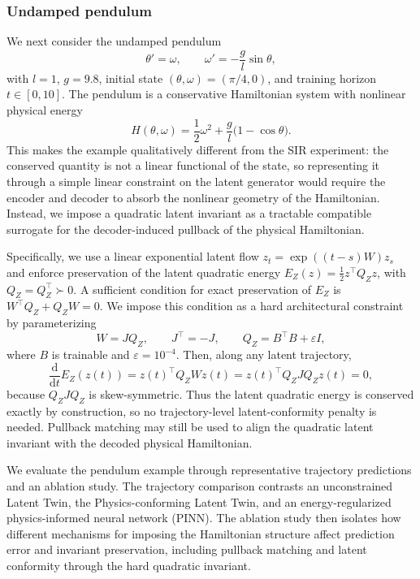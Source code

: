 \documentclass[a4paper,fleqn]{cas-sc}
\theoremstyle{thmstyleone}%
\theoremstyle{thmstyletwo}%
\theoremstyle{thmstylethree}%
\begin{document}
\subsubsection{Undamped pendulum}\label{sec:pendulum}

We next consider the undamped pendulum
\[
    \theta'=\omega,\qquad
    \omega'=-\frac{g}{l}\sin\theta,
\]
with $l=1$, $g=9.8$, initial state $(\theta,\omega)=(\pi/4,0)$, and training horizon $t\in[0,10]$. The pendulum is a conservative Hamiltonian system with nonlinear physical energy
\[
    H(\theta,\omega)
    =
    \frac12 \omega^2+\frac{g}{l}\bigl(1-\cos\theta\bigr).
\]
This makes the example qualitatively different from the SIR experiment: the conserved quantity is not a linear functional of the state, so representing it through a simple linear constraint on the latent generator would require the encoder and decoder to absorb the nonlinear geometry of the Hamiltonian. Instead, we impose a quadratic latent invariant as a tractable compatible surrogate for the decoder-induced pullback of the physical Hamiltonian.

Specifically, we use a linear exponential latent flow $z_t=\exp((t-s)W)z_s$
and enforce preservation of the latent quadratic energy
$ E_Z(z)=\frac12 z^\top Q_Z z$, with $Q_Z=Q_Z^\top\succ0$. A sufficient condition for exact preservation of $E_Z$ is $W^\top Q_Z+Q_ZW=0$.
We impose this condition as a hard architectural constraint by parameterizing
\[
    W=JQ_Z,\qquad
    J^\top=-J,\qquad
    Q_Z=B^\top B+\varepsilon I, 
\]
where $B$ is trainable and $\varepsilon=10^{-4}$. Then, along any latent trajectory,
\[
    \frac{\mathrm d}{\mathrm dt}E_Z(z(t)) =  z(t)^\top Q_Z W z(t) = z(t)^\top Q_Z J Q_Z z(t) = 0,
\]
because $Q_ZJQ_Z$ is skew-symmetric. Thus the latent quadratic energy is conserved exactly by construction, so no trajectory-level latent-conformity penalty is needed. Pullback matching may still be used to align the quadratic latent invariant with the decoded physical Hamiltonian.

We evaluate the pendulum example through representative trajectory predictions and an ablation study. The trajectory comparison contrasts an unconstrained Latent Twin, the Physics-conforming Latent Twin, and an energy-regularized physics-informed neural network (PINN). The ablation study then isolates how different mechanisms for imposing the Hamiltonian structure affect prediction error and invariant preservation, including pullback matching and latent conformity through the hard quadratic invariant.
\end{document}
